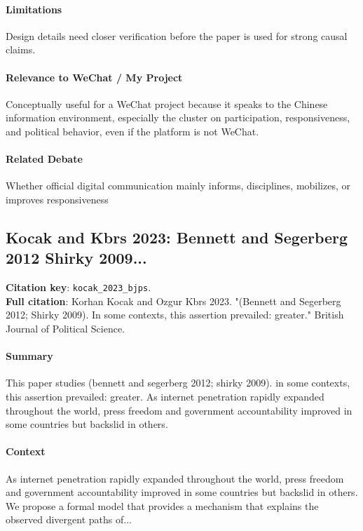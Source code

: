 \documentclass[12pt]{article}
\begin{document}
\paragraph{Limitations} Design details need closer verification before the paper is used for strong causal claims.

\paragraph{Relevance to WeChat / My Project} Conceptually useful for a WeChat project because it speaks to the Chinese information environment, especially the cluster on participation, responsiveness, and political behavior, even if the platform is not WeChat.

\paragraph{Related Debate} Whether official digital communication mainly informs, disciplines, mobilizes, or improves responsiveness


\subsection{Kocak and Kbrs 2023: Bennett and Segerberg 2012 Shirky 2009...}
\textbf{Citation key}: \texttt{kocak\_2023\_bjps}.\\
\textbf{Full citation}: Korhan Kocak and Ozgur Kbrs 2023. "(Bennett and Segerberg 2012; Shirky 2009). In some contexts, this assertion prevailed: greater." British Journal of Political Science.

\paragraph{Summary} This paper studies (bennett and segerberg 2012; shirky 2009). in some contexts, this assertion prevailed: greater. As internet penetration rapidly expanded throughout the world, press freedom and government accountability improved in some countries but backslid in others.

\paragraph{Context} As internet penetration rapidly expanded throughout the world, press freedom and government accountability improved in some countries but backslid in others. We propose a formal model that provides a mechanism that explains the observed divergent paths of...
\end{document}
